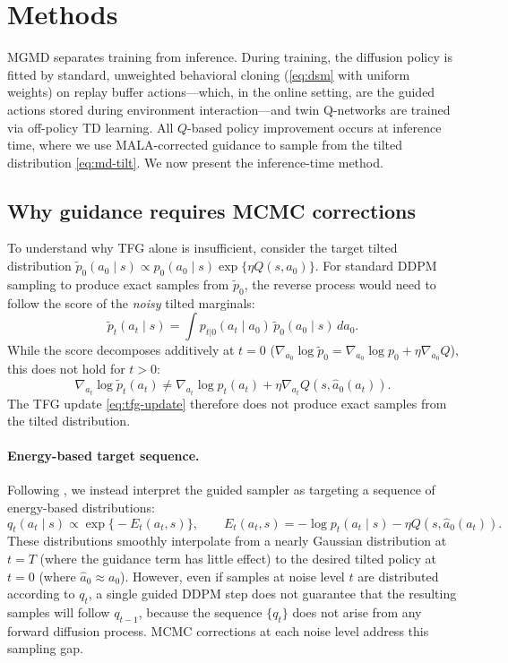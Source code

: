 \documentclass{article}
\theoremstyle{plain}
\theoremstyle{definition}
\theoremstyle{remark}
\begin{document}
\section{Methods}
\label{sec:methods}

MGMD separates training from inference.
During training, the diffusion policy is fitted by standard, unweighted behavioral cloning (\cref{eq:dsm} with uniform weights) on replay buffer actions---which, in the online setting, are the guided actions stored during environment interaction---and twin Q-networks are trained via off-policy TD learning.
All $Q$-based policy improvement occurs at inference time, where we use MALA-corrected guidance to sample from the tilted distribution \cref{eq:md-tilt}.
We now present the inference-time method.

\subsection{Why guidance requires MCMC corrections}
\label{sec:why-mcmc}

To understand why TFG alone is insufficient, consider the target tilted distribution $\tilde{p}_0(a_0 \mid s) \propto p_0(a_0 \mid s) \exp\{\eta Q(s, a_0)\}$.
For standard DDPM sampling to produce exact samples from $\tilde{p}_0$, the reverse process would need to follow the score of the \emph{noisy} tilted marginals:
\begin{equation}
  \tilde{p}_t(a_t \mid s) = \int p_{t|0}(a_t \mid a_0)\, \tilde{p}_0(a_0 \mid s)\, da_0.
  \label{eq:tilted-marginal}
\end{equation}
While the score decomposes additively at $t=0$ ($\nabla_{a_0} \log \tilde{p}_0 = \nabla_{a_0} \log p_0 + \eta \nabla_{a_0} Q$), this does not hold for $t > 0$:
\begin{equation}
  \nabla_{a_t} \log \tilde{p}_t(a_t) \neq \nabla_{a_t} \log p_t(a_t) + \eta \nabla_{a_t} Q(s, \hat{a}_0(a_t)).
  \label{eq:score-mismatch}
\end{equation}
The TFG update \cref{eq:tfg-update} therefore does not produce exact samples from the tilted distribution.

\paragraph{Energy-based target sequence.}
Following \citet{du2023reduce_reuse_recycle}, we instead interpret the guided sampler as targeting a sequence of energy-based distributions:
\begin{equation}
  q_t(a_t \mid s) \propto \exp\bigl\{-E_t(a_t, s)\bigr\}, \qquad
  E_t(a_t, s) = -\log p_t(a_t \mid s) - \eta Q(s, \hat{a}_0(a_t)).
  \label{eq:energy-sequence}
\end{equation}
These distributions smoothly interpolate from a nearly Gaussian distribution at $t=T$ (where the guidance term has little effect) to the desired tilted policy at $t=0$ (where $\hat{a}_0 \approx a_0$).
However, even if samples at noise level $t$ are distributed according to $q_t$, a single guided DDPM step does not guarantee that the resulting samples will follow $q_{t-1}$, because the sequence $\{q_t\}$ does not arise from any forward diffusion process.
MCMC corrections at each noise level address this sampling gap.
\end{document}

